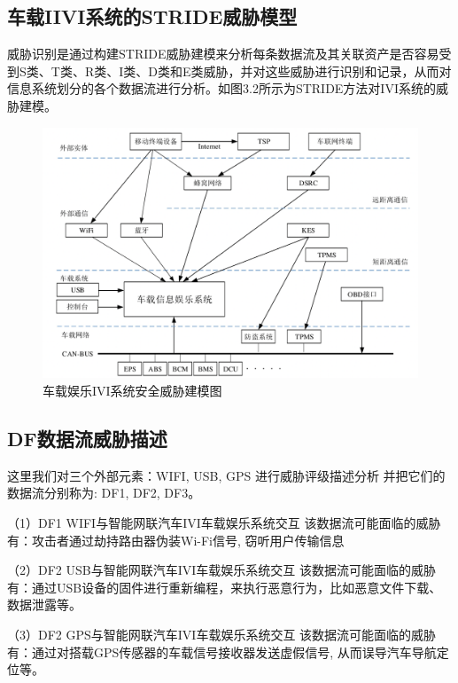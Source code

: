 \subsection{车载IIVI系统的STRIDE威胁模型}
威胁识别是通过构建STRIDE威胁建模来分析每条数据流及其关联资产是否容易受到S类、T类、R类、I类、D类和E类威胁，并对这些威胁进行识别和记录，从而对信息系统划分的各个数据流进行分析。如图3.2所示为STRIDE方法对IVI系统的威胁建模。
\begin{figure}
  \centering
  \includegraphics[scale=0.6]{resources/img/i33.png}
  \caption{车载娱乐IVI系统安全威胁建模图}
\end{figure}
\subsection{DF数据流威胁描述}
这里我们对三个外部元素：WIFI, USB, GPS 进行威胁评级描述分析
并把它们的数据流分别称为: DF1, DF2, DF3。

（1）DF1 WIFI与智能网联汽车IVI车载娱乐系统交互
该数据流可能面临的威胁有：攻击者通过劫持路由器伪装Wi-Fi信号, 窃听用户传输信息\cite{berghel2005wifi}

（2）DF2 USB与智能网联汽车IVI车载娱乐系统交互
该数据流可能面临的威胁有：通过USB设备的固件进行重新编程，来执行恶意行为，比如恶意文件下载、数据泄露等\cite{nissim2017usb}。

（3）DF2 GPS与智能网联汽车IVI车载娱乐系统交互
该数据流可能面临的威胁有：通过对搭载GPS传感器的车载信号接收器发送虚假信号, 从而误导汽车导航定位等\cite{alamleh2020cheat}。
